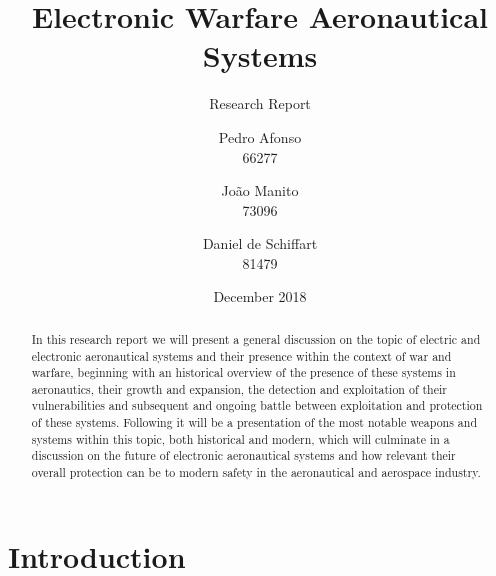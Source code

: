 \documentclass[palatino,english]{ist-report}
\author{Pedro Afonso \\ 66277 \and João Manito \\ 73096 \and Daniel de Schiffart \\ 81479}
\title{Electronic Warfare Aeronautical Systems}
\subtitle{Research Report}
\date{December 2018}
\begin{document}
\makecover{}

\begin{abstract}
	In this research report we will present a general discussion on the topic of electric and electronic aeronautical systems and their presence within the context of war and warfare, beginning with an historical overview of the presence of these systems in aeronautics, their growth and expansion, the detection and exploitation of their vulnerabilities and subsequent and ongoing battle between exploitation and protection of these systems. Following it will be a presentation of the most notable weapons and systems within this topic, both historical and modern, which will culminate in a discussion on the future of electronic aeronautical systems and how relevant their overall protection  can be to modern safety in the aeronautical and aerospace industry.
\end{abstract}

{ \tableofcontents}

\pagebreak

\section{Introduction}
\end{document}
